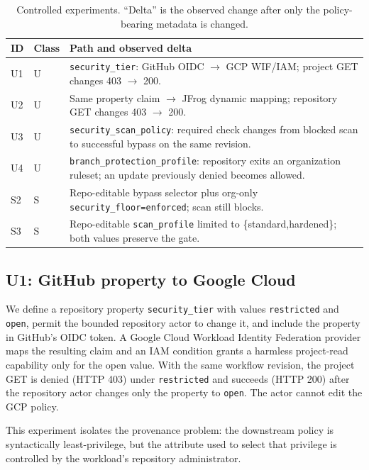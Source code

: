 \documentclass[sigconf,review,anonymous]{acmart}
\newcommand{\U}{\textsf{U}}
\newcommand{\Ssafe}{\textsf{S}}
\begin{document}
\begin{table}[t]
\caption{Controlled experiments.  ``Delta'' is the observed change after only
the policy-bearing metadata is changed.}
\label{tab:controlled}
\small
\begin{tabularx}{\columnwidth}{@{}l l X@{}}
\toprule
ID & Class & Path and observed delta \\
\midrule
U1 & \U{} & \texttt{security\_tier}: GitHub OIDC $\rightarrow$ GCP WIF/IAM; project GET changes 403 $\rightarrow$ 200. \\
U2 & \U{} & Same property claim $\rightarrow$ JFrog dynamic mapping; repository GET changes 403 $\rightarrow$ 200. \\
U3 & \U{} & \texttt{security\_scan\_policy}: required check changes from blocked scan to successful bypass on the same revision. \\
U4 & \U{} & \texttt{branch\_protection\_profile}: repository exits an organization ruleset; an update previously denied becomes allowed. \\
S2 & \Ssafe{} & Repo-editable bypass selector plus org-only \texttt{security\_floor=enforced}; scan still blocks. \\
S3 & \Ssafe{} & Repo-editable \texttt{scan\_profile} limited to \{standard,hardened\}; both values preserve the gate. \\
\bottomrule
\end{tabularx}
\end{table}

\subsection{U1: GitHub property to Google Cloud}

We define a repository property \texttt{security\_tier} with values
\texttt{restricted} and \texttt{open}, permit the bounded repository actor to
change it, and include the property in GitHub's OIDC token.  A Google Cloud
Workload Identity Federation provider maps the resulting claim and an IAM
condition grants a harmless project-read capability only for the open value.
With the same workflow revision, the project GET is denied (HTTP 403) under
\texttt{restricted} and succeeds (HTTP 200) after the repository actor changes
only the property to \texttt{open}.  The actor cannot edit the GCP policy.

This experiment isolates the provenance problem: the downstream policy is
syntactically least-privilege, but the attribute used to select that privilege is
controlled by the workload's repository administrator.
\end{document}
